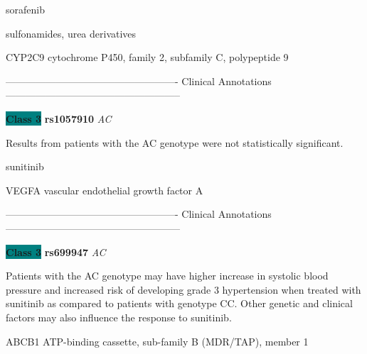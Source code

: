 \documentclass{resume} %
\begin{document}
\begin{rSection}{ sorafenib }
\end{rSection}\begin{rSection}{ sulfonamides, urea derivatives }
\item[]

\begin{rSubsection}{ CYP2C9 }{ cytochrome P450, family 2, subfamily C, polypeptide 9 }{}{}
\item[]

\item[] ---------------------------------------------------- Clinical Annotations -----------------------------------------------------\newline
\item \textbf{\colorbox{teal} {Class 3}} \textbf{ rs1057910 } \textit{ AC }
\item[] Results from patients with the AC genotype were not statistically significant.
\end{rSubsection}

\end{rSection}\begin{rSection}{ sunitinib }
\item[]

\begin{rSubsection}{ VEGFA }{ vascular endothelial growth factor A }{}{}
\item[]

\item[] ---------------------------------------------------- Clinical Annotations -----------------------------------------------------\newline
\item \textbf{\colorbox{teal} {Class 3}} \textbf{ rs699947 } \textit{ AC }
\item[] Patients with the AC genotype may have higher increase in systolic blood pressure and increased risk of developing grade 3 hypertension when treated with sunitinib as compared to patients with genotype CC. Other genetic and clinical factors may also influence the response to sunitinib.
\end{rSubsection}\begin{rSubsection}{ ABCB1 }{ ATP-binding cassette, sub-family B (MDR/TAP), member 1 }{}{}
\item[]


\end{rSubsection}
\end{rSection}
\end{document}
